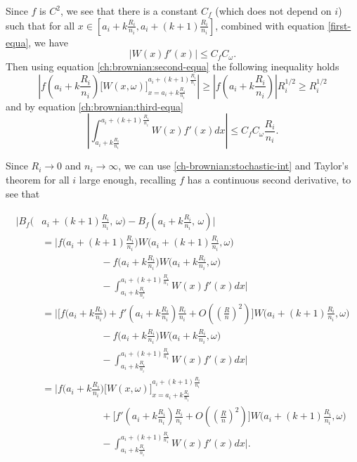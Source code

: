 	Since $f$ is $C^2$, we see that there is a constant $C_f$ (which does not depend on $i$) such that for all $x\in \left[{a_i+k\frac{R_i}{n_i}},{a_i+(k+1)\frac{R_i}{n_i}}\right]$, combined with equation \eqref{first-equa}, we have
	\begin{equation}
	\lvert W(x)f'(x)\rvert \leq C_f C_\omega. \label{ch:brownian:third-equa}
	\end{equation}
	Then using equation \eqref{ch:brownian:second-equa} the following inequality holds
	\begin{equation}
	\left| f\left(a_i+k\frac{R_i}{n_i}\right)\bigg[W(x,\omega)\bigg]_{x=a_i+k\frac{R_i}{n_i}}^{a_i+(k+1)\frac{R_i}{n_i}} \right| \geq \left| f\left(a_i+k\frac{R_i}{n_i}\right) \right| R_i^{1/2}\geq R_i^{1/2}\label{ch:brownian:ineq-one}    
	\end{equation}
	and by equation \eqref{ch:brownian:third-equa}
	\begin{equation}\label{ch-brownian:fourth-equa}
	\left\vert\int_{a_i+k\frac{R_i}{n_i}}^{a_i+(k+1)\frac{R_i}{n_i}} W(x)f'(x)dx \right\vert\leq C_fC_\omega\frac{R_i}{n_i}.
	\end{equation}
	
	Since $R_i\to 0$ and $n_i \rightarrow \infty$, we can use \eqref{ch-brownian:stochastic-int} and Taylor's theorem for all $i$ large enough, recalling $f$ has a continuous second derivative, to see that

	
	\begin{align}\label{ch:brownian:pre-main-equa}
	    \bigg\vert B_f\bigg(&a_i+(k+1)\frac{R_i}{n_i},\,\omega\bigg)-B_f\left(a_i+k\frac{R_i}{n_i},\,\omega\right)\bigg\vert \nonumber \\
	    &= \bigg\vert f\bigg(a_i+(k+1)\frac{R_i}{n_i}\bigg)W\bigg(a_i+(k+1)\frac{R_i}{n_i},\omega\bigg) \nonumber \\
	    &\qquad \qquad \qquad- f\bigg(a_i+k\frac{R_i}{n_i}\bigg)W\bigg(a_i+k\frac{R_i}{n_i},\omega\bigg) \nonumber \\
	    &\qquad \qquad \qquad- \int_{a_i+k \frac{R_i}{n_i}}^{a_i+(k+1)\frac{R_i}{n_1}}W(x)f'(x)dx \bigg\vert  \nonumber \\
	    &= \bigg\vert \bigg[f\bigg(a_i+k\frac{R_i}{n_i}\bigg) + f'\left(a_i + k \frac{R_i}{n_i}\right)\frac{R_i}{n_i} + O\left(\left(\frac{R}{n}\right)^2\right)\bigg]W\bigg(a_i+(k+1)\frac{R_i}{n_i},\omega\bigg) \nonumber \\
	    &\qquad \qquad \qquad- f\bigg(a_i+k\frac{R_i}{n_i}\bigg)W\bigg(a_i+k\frac{R_i}{n_i},\omega\bigg) \nonumber \\
	    &\qquad \qquad \qquad- \int_{a_i+k \frac{R_i}{n_i}}^{a_i+(k+1)\frac{R_i}{n_1}}W(x)f'(x)dx \bigg\vert  \nonumber\\
	    &= \bigg\vert f\bigg(a_i+k\frac{R_i}{n_i}\bigg)\bigg[W(x,\omega)\bigg]_{x=a_i+k\frac{R_i}{n_i}}^{a_i+(k+1)\frac{R_i}{n_i}} \nonumber \\
	    & \qquad \qquad \qquad+ \bigg[f'\left(a_i + k \frac{R_i}{n_i}\right)\frac{R_i}{n_i} + O\left(\left(\frac{R}{n}\right)^2\right)\bigg]W\bigg(a_i+(k+1)\frac{R_i}{n_i},\omega\bigg) \nonumber \\
	    &\qquad \qquad \qquad- \int_{a_i+k \frac{R_i}{n_i}}^{a_i+(k+1)\frac{R_i}{n_1}}W(x)f'(x)dx \bigg\vert.  
	\end{align}	
	
